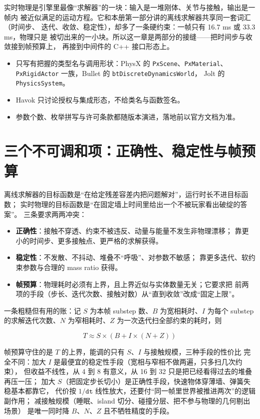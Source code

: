 \documentclass[12pt,a4paper,fontset=fandol]{ctexbook}
\newcommand{\Tp}[1]{\texttt{#1}}
\newcommand{\Bk}{\discretionary{}{}{}}
\begin{document}
实时物理是引擎里最像``求解器''的一块：输入是一堆刚体、关节与接触，输出是一帧内
被近似满足的运动方程。它和本册第一部分讲的离线求解器共享同一套词汇（时间步、
迭代、收敛、稳定性），却多了一条硬约束：一帧只有 16.7 ms 或 33.3 ms，物理只是
被切出来的一小块。所以这一章是两部分的接缝——把时间步与收敛接到帧预算上，
再接到中间件的 C++ 接口形态上。

\begin{guideline}[title={本章口径}]
\begin{itemize}
  \item 只写有把握的类型名与调用形状：PhysX 的 \Tp{PxScene}、\Tp{PxMaterial}、
        \Tp{Px{\Bk}Rigid{\Bk}Actor} 一族，Bullet 的 \Tp{bt{\Bk}Discrete{\Bk}Dynamics{\Bk}World}，
        Jolt 的 \Tp{Physics{\Bk}System}。
  \item Havok 只讨论授权与集成形态，不给类名与函数签名。
  \item 参数个数、枚举拼写与许可条款都随版本演进，落地前以官方文档为准。
\end{itemize}
\end{guideline}

\section{三个不可调和项：正确性、稳定性与帧预算}
\label{sec:ch13-triangle}

离线求解器的目标函数是``在给定残差容差内把问题解对''，运行时长不进目标函数；
实时物理的目标函数是``在固定墙上时间里给出一个不被玩家看出破绽的答案''。
三条要求两两冲突：

\begin{itemize}
  \item \textbf{正确性}：接触不穿透、约束不被违反、动量与能量不发生非物理漂移；
        靠更小的时间步、更多接触点、更严格的求解获得。
  \item \textbf{稳定性}：不发散、不抖动、堆叠不``呼吸''、对参数不敏感；
        靠更多迭代、软约束参数与合理的 mass ratio 获得。
  \item \textbf{帧预算}：物理耗时必须有上界，且上界近似与实体数量无关；它要求把
        前两项的手段（步长、迭代次数、接触对数）从``直到收敛''改成``固定上限''。
\end{itemize}

一条粗糙但有用的账：记 $S$ 为本帧 substep 数、$B$ 为宽相耗时、$I$ 为每个
substep 的求解迭代次数、$N$ 为窄相耗时、$Z$ 为一次迭代扫全部约束的耗时，则

\[
  T \approx S \times (B + I \times (N + Z))
\]

帧预算守住的是 $T$ 的上界，能调的只有 $S$、$I$ 与接触规模，三种手段的性价比
完全不同：加大 $I$ 是最便宜的稳定性手段（宽相与窄相不做两遍，只多扫几次约束），
但收益不线性，从 4 到 8 有意义，从 16 到 32 只是把已经看得过去的堆叠再压一压；
加大 $S$（把固定步长切小）是正确性手段，快速物体穿薄墙、弹簧失稳基本都靠它，
代价按 $1/\Tp{dt}$ 线性放大，还要付``同一帧里世界被推进两次''的逻辑副作用；
减接触规模（睡眠、island 切分、碰撞分层、把不参与物理的几何剔出场景）
是唯一同时降 $B$、$N$、$Z$ 且不牺牲精度的手段。
\end{document}
